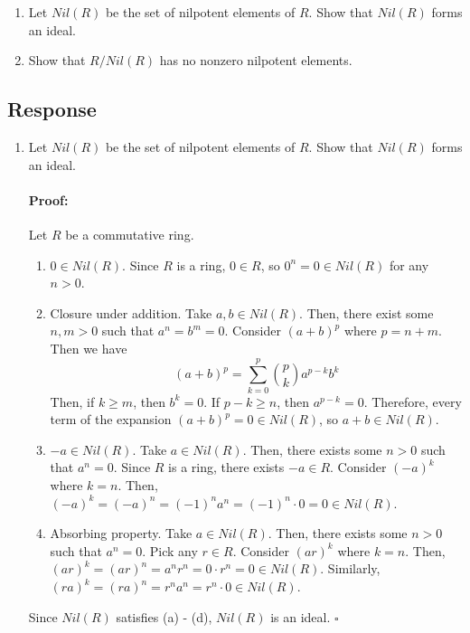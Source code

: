 \documentclass [12pt] {article}
\newenvironment{proof}{\paragraph{Proof:}}{\hfill$\square$}
\begin{document}
\begin{enumerate}
    \item Let $Nil(R)$ be the set of nilpotent elements of $R$. Show that $Nil(R)$ forms an ideal. 

    \item Show that $R/Nil(R)$ has no nonzero nilpotent elements.
\end{enumerate}

\subsection*{Response}
\begin{enumerate}
    \item Let $Nil(R)$ be the set of nilpotent elements of $R$. Show that $Nil(R)$ forms an ideal. 
        \begin{proof}
            Let $R$ be a commutative ring.
            \begin{enumerate}
                \item $0 \in Nil(R)$. Since $R$ is a ring, $0 \in R$, so $0^n = 0 \in Nil(R)$ for any $n > 0$.
                \item Closure under addition. Take $a, b \in Nil(R)$. Then, there exist some $n, m > 0$ such
                    that $a^n = b^m = 0$. Consider $(a + b)^p$ where $p = n + m$. Then we have
                    \[(a + b)^p = \sum^p_{k = 0} \binom{p}{k} a^{p - k} b^k\]
                    Then, if $k \geq m$, then $b^k = 0$. If $p - k \geq n$, then $a^{p - k} = 0$.
                    Therefore, every term of the expansion $(a + b)^p = 0 \in Nil(R)$, so $a + b \in Nil(R)$.
                \item $-a \in Nil(R)$. Take $a \in Nil(R)$. Then, there exists some $n > 0$ such that 
                    $a^n = 0$. Since $R$ is a ring, there exists $-a \in R$. Consider $(-a)^k$ where $k = n$.
                    Then, $(-a)^k = (-a)^n = (-1)^n a^n = (-1)^n \cdot 0 = 0 \in Nil(R)$.
                \item Absorbing property. Take $a \in Nil(R)$. Then, there exists some $n > 0$ such that 
                    $a^n = 0$. Pick any $r \in R$. Consider $(ar)^k$ where $k = n$. Then, 
                    $(ar)^k = (ar)^n = a^n r^n = 0 \cdot r^n = 0 \in Nil(R)$. Similarly, 
                    $(ra)^k = (ra)^n = r^n a^n = r^n \cdot 0 \in Nil(R)$.
            \end{enumerate}
            Since $Nil(R)$ satisfies (a) - (d), $Nil(R)$ is an ideal.
        \end{proof}

\end{enumerate}
\end{document}
